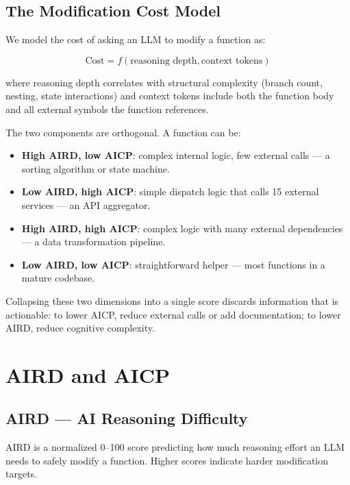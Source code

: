 \documentclass[10pt,twocolumn,letterpaper]{article}
\begin{document}
\subsection{The Modification Cost Model}

We model the cost of asking an LLM to modify a function as:

\begin{equation}
\text{Cost} = f(\text{reasoning depth}, \text{context tokens})
\end{equation}

where reasoning depth correlates with structural complexity (branch count,
nesting, state interactions) and context tokens include both the function
body and all external symbols the function references.

The two components are orthogonal.  A function can be:
\begin{itemize}
    \item \textbf{High AIRD, low AICP}: complex internal logic, few external
        calls --- a sorting algorithm or state machine.
    \item \textbf{Low AIRD, high AICP}: simple dispatch logic that calls
        15 external services --- an API aggregator.
    \item \textbf{High AIRD, high AICP}: complex logic with many external
        dependencies --- a data transformation pipeline.
    \item \textbf{Low AIRD, low AICP}: straightforward helper --- most
        functions in a mature codebase.
\end{itemize}

Collapsing these two dimensions into a single score discards information
that is actionable: to lower AICP, reduce external calls or add
documentation; to lower AIRD, reduce cognitive complexity.

\section{AIRD and AICP}
\label{sec:metrics}

\subsection{AIRD --- AI Reasoning Difficulty}

AIRD is a normalized 0--100 score predicting how much reasoning effort
an LLM needs to safely modify a function.  Higher scores indicate harder
modification targets.
\end{document}
